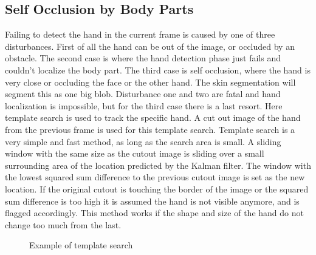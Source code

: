 \subsection*{Self Occlusion by Body Parts}
Failing to detect the hand in the current frame is caused by one of three disturbances. First of all the hand can be out of the image, or occluded by an obstacle. The second case is where the hand detection phase just fails and couldn't localize the body part. The third case is self occlusion, where the hand is very close or occluding the face or the other hand.  The skin segmentation will segment this as one big blob. Disturbance one and two are fatal and hand localization is impossible, but for the third case there is a last resort. Here template search is used to track the specific hand. A cut out image of the hand from the previous frame is used for this template search. Template search is a very simple and fast method, as long as the search area is small. A sliding window  with the same size as the cutout image is sliding over a small surrounding area of the location predicted by the Kalman filter. The window with the lowest squared sum difference to the previous cutout image is set as the new location. If the original cutout is touching the border of the image or the squared sum difference is too high it is assumed the hand is not visible anymore, and is flagged accordingly. This method works if the shape and size of the hand do not change too much from the last.

\begin{figure}[tb]
\begin{center}
\hspace{0.03\linewidth}
\end{center}
\caption{Example of template search}
\label{fig:templatesearch}
\end{figure}

